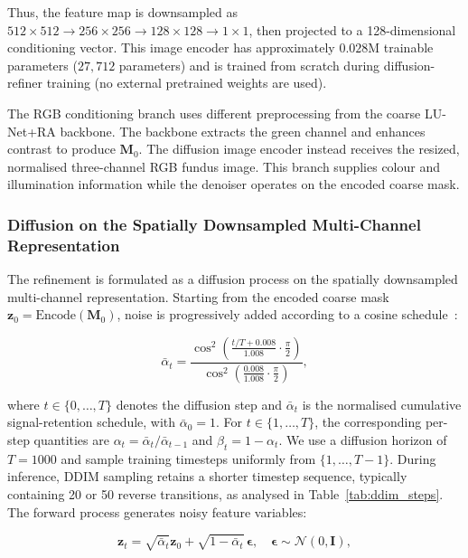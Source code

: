 \documentclass[jimaging,article,submit,pdftex,moreauthors]{Definitions/mdpi}%
\begin{document}
Thus, the feature map is downsampled as $512\times512\rightarrow256\times256\rightarrow128\times128\rightarrow1\times1$, then projected to a 128-dimensional conditioning vector. This image encoder has approximately $0.028$M trainable parameters ($27{,}712$ parameters) and is trained from scratch during diffusion-refiner training (no external pretrained weights are used).



The RGB conditioning branch uses different preprocessing from the coarse LU-Net+RA backbone. The backbone extracts the green channel and enhances contrast to produce $\mathbf{M}_0$. The diffusion image encoder instead receives the resized, normalised three-channel RGB fundus image. This branch supplies colour and illumination information while the denoiser operates on the encoded coarse mask.

\subsubsection{Diffusion on the Spatially Downsampled Multi-Channel Representation}



The refinement is formulated as a diffusion process on the spatially downsampled multi-channel representation. Starting from the encoded coarse mask $\mathbf{z}_0=\mathrm{Encode}(\mathbf{M}_0)$, noise is progressively added according to a cosine schedule~\cite{Nichol2021}:

\begin{equation}
\bar{\alpha}_t=\frac{\cos^2\!\left(\frac{t/T+0.008}{1.008}\cdot\frac{\pi}{2}\right)}{\cos^2\!\left(\frac{0.008}{1.008}\cdot\frac{\pi}{2}\right)},
\end{equation}

where $t\in\{0,\dots,T\}$ denotes the diffusion step and $\bar{\alpha}_t$ is the normalised cumulative signal-retention schedule, with $\bar{\alpha}_0=1$. For $t\in\{1,\dots,T\}$, the corresponding per-step quantities are $\alpha_t=\bar{\alpha}_t/\bar{\alpha}_{t-1}$ and $\beta_t=1-\alpha_t$. We use a diffusion horizon of $T=1000$ and sample training timesteps uniformly from $\{1,\dots,T-1\}$. During inference, DDIM sampling retains a shorter timestep sequence, typically containing 20 or 50 reverse transitions, as analysed in Table~\ref{tab:ddim_steps}. The forward process generates noisy feature variables:

\begin{equation}
\mathbf{z}_t=\sqrt{\bar{\alpha}_t}\mathbf{z}_0+\sqrt{1-\bar{\alpha}_t}\,\boldsymbol{\epsilon}, 
\quad \boldsymbol{\epsilon}\sim\mathcal{N}(0,\mathbf{I}),
\end{equation}
\end{document}
